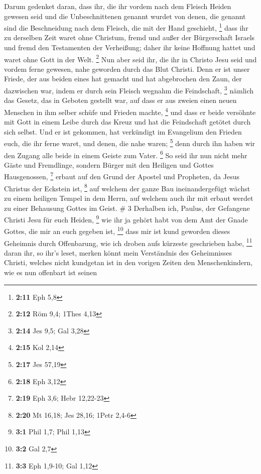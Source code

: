  Darum gedenket daran, dass ihr, die ihr vordem nach dem
Fleisch Heiden gewesen seid und die Unbeschnittenen genannt wurdet von
denen, die genannt sind die Beschneidung nach dem Fleisch, die mit der
Hand geschieht, \footnote{\textbf{2:11} Eph 5,8}  dass
ihr zu derselben Zeit waret ohne Christum, fremd und außer der
Bürgerschaft Israels und fremd den Testamenten der Verheißung; daher ihr
keine Hoffnung hattet und waret ohne Gott in der Welt. \footnote{\textbf{2:12}
  Röm 9,4; 1Thes 4,13}  Nun aber seid ihr, die ihr in
Christo Jesu seid und vordem ferne gewesen, nahe geworden durch das Blut
Christi.  Denn er ist unser Friede, der aus beiden eines
hat gemacht und hat abgebrochen den Zaun, der dazwischen war, indem er
durch sein Fleisch wegnahm die Feindschaft, \footnote{\textbf{2:14} Jes
  9,5; Gal 3,28}  nämlich das Gesetz, das in Geboten
gestellt war, auf dass er aus zweien einen neuen Menschen in ihm selber
schüfe und Frieden machte, \footnote{\textbf{2:15} Kol 2,14}
 und dass er beide versöhnte mit Gott in einem Leibe
durch das Kreuz und hat die Feindschaft getötet durch sich selbst.
 Und er ist gekommen, hat verkündigt im Evangelium den
Frieden euch, die ihr ferne waret, und denen, die nahe waren;
\footnote{\textbf{2:17} Jes 57,19}  denn durch ihn haben
wir den Zugang alle beide in einem Geiste zum Vater. \footnote{\textbf{2:18}
  Eph 3,12}  So seid ihr nun nicht mehr Gäste und
Fremdlinge, sondern Bürger mit den Heiligen und Gottes Hausgenossen,
\footnote{\textbf{2:19} Eph 3,6; Hebr 12,22-23}  erbaut
auf den Grund der Apostel und Propheten, da Jesus Christus der Eckstein
ist, \footnote{\textbf{2:20} Mt 16,18; Jes 28,16; 1Petr 2,4-6}
 auf welchem der ganze Bau ineinandergefügt wächst zu
einem heiligen Tempel in dem Herrn,  auf welchem auch ihr
mit erbaut werdet zu einer Behausung Gottes im Geist. \# 3
 Derhalben ich, Paulus, der Gefangene Christi Jesu für
euch Heiden, \footnote{\textbf{3:1} Phil 1,7; Phil 1,13} 
wie ihr ja gehört habt von dem Amt der Gnade Gottes, die mir an euch
gegeben ist, \footnote{\textbf{3:2} Gal 2,7}  dass mir ist
kund geworden dieses Geheimnis durch Offenbarung, wie ich droben aufs
kürzeste geschrieben habe, \footnote{\textbf{3:3} Eph 1,9-10; Gal 1,12}
 daran ihr, so ihr's leset, merken könnt mein Verständnis
des Geheimnisses Christi,  welches nicht kundgetan ist in
den vorigen Zeiten den Menschenkindern, wie es nun offenbart ist seinen
